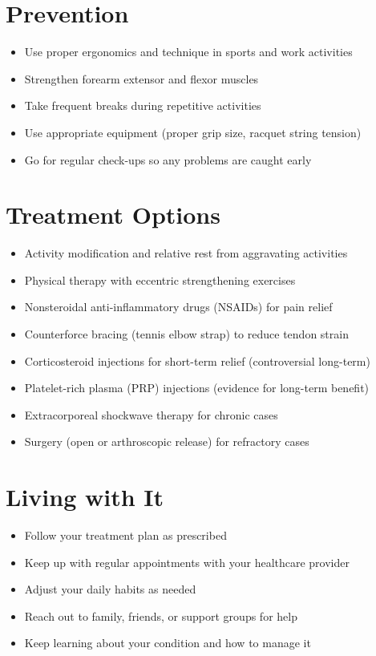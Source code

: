 \section{Prevention}

\begin{itemize}[noitemsep]
  \item Use proper ergonomics and technique in sports and work activities
  \item Strengthen forearm extensor and flexor muscles
  \item Take frequent breaks during repetitive activities
  \item Use appropriate equipment (proper grip size, racquet string tension)
  \item Go for regular check-ups so any problems are caught early
\end{itemize}

\section{Treatment Options}

\begin{itemize}[noitemsep]
  \item Activity modification and relative rest from aggravating activities
  \item Physical therapy with eccentric strengthening exercises
  \item Nonsteroidal anti-inflammatory drugs (NSAIDs) for pain relief
  \item Counterforce bracing (tennis elbow strap) to reduce tendon strain
  \item Corticosteroid injections for short-term relief (controversial long-term)
  \item Platelet-rich plasma (PRP) injections (evidence for long-term benefit)
  \item Extracorporeal shockwave therapy for chronic cases
  \item Surgery (open or arthroscopic release) for refractory cases
\end{itemize}

\section{Living with It}

\begin{itemize}[noitemsep]
  \item Follow your treatment plan as prescribed
  \item Keep up with regular appointments with your healthcare provider
  \item Adjust your daily habits as needed
  \item Reach out to family, friends, or support groups for help
  \item Keep learning about your condition and how to manage it
\end{itemize}

